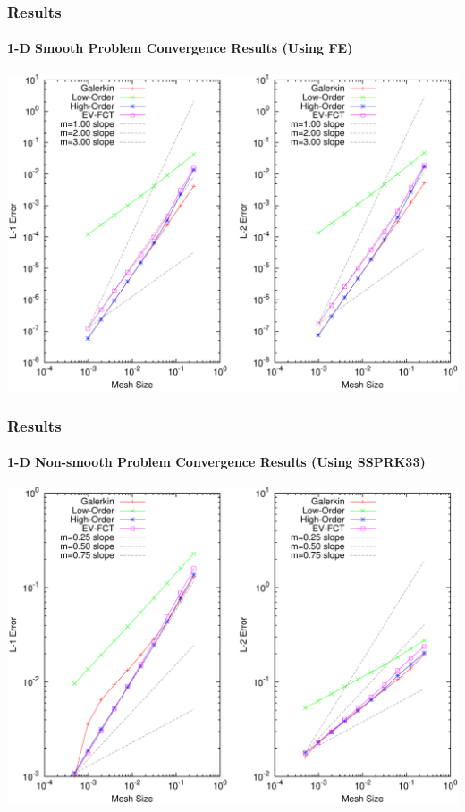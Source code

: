 \documentclass{beamer}
\begin{document}
\begin{frame}
\frametitle{Results}
\framesubtitle{1-D Smooth Problem Convergence Results (Using FE)}

\includegraphics[width=\textwidth]{./figures/convergence_smooth_FE.pdf}

\end{frame}
\begin{frame}
\frametitle{Results}
\framesubtitle{1-D Non-smooth Problem Convergence Results (Using SSPRK33)}

\includegraphics[width=\textwidth]{./figures/convergence_absorber_SSPRK33.pdf}

\end{frame}
\end{document}
